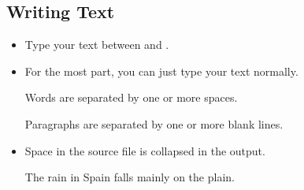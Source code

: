 \documentclass{beamer}
\begin{document}
\subsection*{Writing Text}
\begin{frame}[fragile]{\insertsubsection{}}
\small
\begin{itemize}
\item Type your text between  and .
\item For the most part, you can just type your text normally.
\begin{exampletwouptiny}
Words are separated by one or more
spaces.




Paragraphs are separated by one
or more blank lines.
\end{exampletwouptiny}
\item Space in the source file is collapsed in the output.
\begin{exampletwouptiny}
The   rain       in Spain
falls mainly on the plain.
\end{exampletwouptiny}
\end{itemize}
\end{frame}
\end{document}

